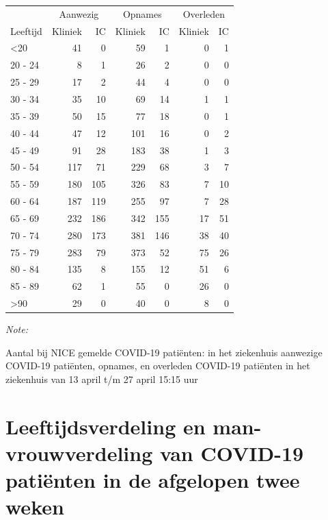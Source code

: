 \documentclass[
  english,
  man,floatsintext]{apa6}
\begin{document}
\begin{table}
\centering\begingroup\fontsize{10}{12}\selectfont

\begin{threeparttable}
\begin{tabular}{lrrrrrr}
\toprule
\multicolumn{1}{c}{ } & \multicolumn{2}{c}{Aanwezig} & \multicolumn{2}{c}{Opnames} & \multicolumn{2}{c}{Overleden} \\
\cmidrule(l{3pt}r{3pt}){2-3} \cmidrule(l{3pt}r{3pt}){4-5} \cmidrule(l{3pt}r{3pt}){6-7}
Leeftijd & Kliniek & IC & Kliniek & IC & Kliniek & IC\\
\midrule
<20 & 41 & 0 & 59 & 1 & 0 & 1\\
20 - 24 & 8 & 1 & 26 & 2 & 0 & 0\\
25 - 29 & 17 & 2 & 44 & 4 & 0 & 0\\
30 - 34 & 35 & 10 & 69 & 14 & 1 & 1\\
35 - 39 & 50 & 15 & 77 & 18 & 0 & 1\\
40 - 44 & 47 & 12 & 101 & 16 & 0 & 2\\
45 - 49 & 91 & 28 & 183 & 38 & 1 & 3\\
50 - 54 & 117 & 71 & 229 & 68 & 3 & 7\\
55 - 59 & 180 & 105 & 326 & 83 & 7 & 10\\
60 - 64 & 187 & 119 & 255 & 97 & 7 & 28\\
65 - 69 & 232 & 186 & 342 & 155 & 17 & 51\\
70 - 74 & 280 & 173 & 381 & 146 & 38 & 40\\
75 - 79 & 283 & 79 & 373 & 52 & 75 & 26\\
80 - 84 & 135 & 8 & 155 & 12 & 51 & 6\\
85 - 89 & 62 & 1 & 55 & 0 & 26 & 0\\
>90 & 29 & 0 & 40 & 0 & 8 & 0\\
\bottomrule
\end{tabular}
\begin{tablenotes}
\item \textit{Note: } 
\item Aantal bij NICE gemelde COVID-19 patiënten: in het ziekenhuis aanwezige COVID-19 patiënten, opnames, en overleden COVID-19 patiënten in het ziekenhuis van 13 april t/m 27 april 15:15 uur
\end{tablenotes}
\end{threeparttable}
\endgroup{}
\end{table}

\newpage

\hypertarget{leeftijdsverdeling-en-man-vrouwverdeling-van-covid-19-patiuxebnten-in-de-afgelopen-twee-weken}{%
\section{Leeftijdsverdeling en man-vrouwverdeling van COVID-19 patiënten in de afgelopen twee weken}\label{leeftijdsverdeling-en-man-vrouwverdeling-van-covid-19-patiuxebnten-in-de-afgelopen-twee-weken}}
\end{document}

